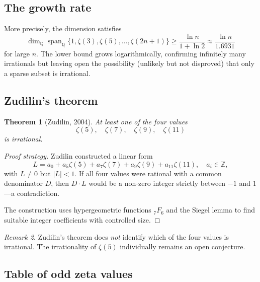 \documentclass[12pt,a4paper]{amsart}
\newtheorem{theorem}{Theorem}[section]
\theoremstyle{definition}
\theoremstyle{remark}
\newtheorem{remark}[theorem]{Remark}
\begin{document}
\subsection{The growth rate}

More precisely, the dimension satisfies
\[
  \dim_{\mathbb{Q}} \operatorname{span}_{\mathbb{Q}}\{1, \zeta(3), \zeta(5),
  \ldots, \zeta(2n+1)\} \geq \frac{\ln n}{1 + \ln 2} \approx \frac{\ln n}{1.6931}
\]
for large $n$. The lower bound grows logarithmically, confirming infinitely many
irrationals but leaving open the possibility (unlikely but not disproved) that
only a sparse subset is irrational.

\subsection{Zudilin's theorem}

\begin{theorem}[Zudilin, 2004]
  At least one of the four values
  \[
    \zeta(5),\quad \zeta(7),\quad \zeta(9),\quad \zeta(11)
  \]
  is irrational.
\end{theorem}

\begin{proof}[Proof strategy]
  Zudilin constructed a linear form
  \[
    L = a_0 + a_5 \zeta(5) + a_7 \zeta(7) + a_9 \zeta(9) + a_{11} \zeta(11),
    \quad a_i \in \mathbb{Z},
  \]
  with $L \neq 0$ but $|L| < 1$. If all four values were rational with a common
  denominator $D$, then $D \cdot L$ would be a non-zero integer strictly between
  $-1$ and $1$---a contradiction.

  The construction uses hypergeometric functions ${}_{7}F_6$ and the Siegel lemma
  to find suitable integer coefficients with controlled size.
\end{proof}

\begin{remark}
  Zudilin's theorem does \emph{not} identify which of the four values is irrational.
  The irrationality of $\zeta(5)$ individually remains an open conjecture.
\end{remark}

\subsection{Table of odd zeta values}
\end{document}
